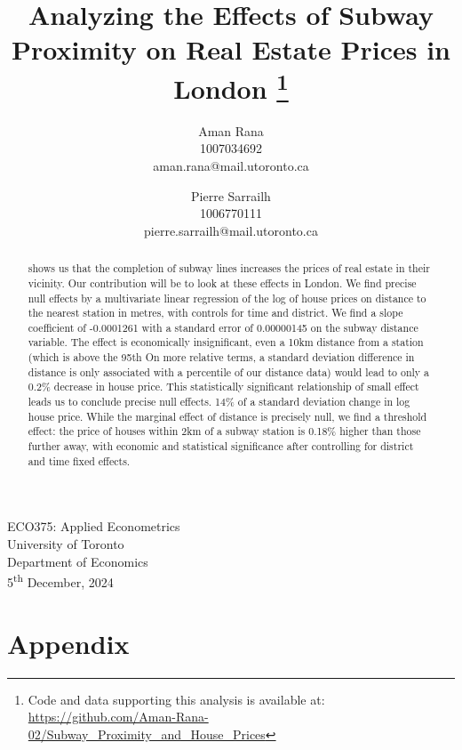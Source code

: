 \documentclass[11pt,a4paper,english]{article}
\date{\displaydate{date}}
\title{Analyzing the Effects of Subway Proximity on Real Estate Prices in London 
\thanks{Code and data supporting this analysis is available at: \url{https://github.com/Aman-Rana-02/Subway_Proximity_and_House_Prices}}}
\author{%
  Aman Rana \\ 1007034692 \\ aman.rana@mail.utoronto.ca
  \and
  Pierre Sarrailh \\ 1006770111 \\ pierre.sarrailh@mail.utoronto.ca
}
\date{}
\begin{document}
  \maketitle
  \begin{center}
    ECO375: Applied Econometrics \\ 
    University of Toronto \\ 
    Department of Economics \\
    5\textsuperscript{th} December, 2024
  \end{center}

  \begin{abstract}
    \noindent \citet{zhou_2019} shows us that the completion of subway lines increases the prices of real estate in their vicinity. Our contribution will be to look at these effects in London. 
     We find precise null effects by a multivariate linear regression of the log of house prices on distance to the nearest station in metres, with controls for time and district.
    We find a slope coefficient of -0.0001261 with a standard error of 0.00000145 on the subway distance variable. 
     The effect is economically insignificant, even a 10km distance from a station (which is above the 95th 
     On more relative terms, a standard deviation difference in distance is only associated with a 
     percentile of our distance data) would lead to only a 0.2\% decrease in house price. This statistically significant relationship of small effect leads us to conclude precise null effects.
     14\% of a standard deviation change in log house price. While the marginal effect of distance is precisely null, we find a threshold effect:
      the price of houses within 2km of a subway station is 0.18\% higher than those further away, with economic and statistical significance after controlling for district and time fixed effects.
  \end{abstract}


  \newpage
  

  

  

  

  \newpage
  
  

  \newpage
  \section*{Appendix}
  \renewcommand{\thesection}{\Alph{section}}
  \setcounter{section}{0}
  
\end{document}
